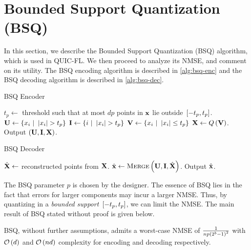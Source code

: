 \documentclass[journal,12pt,twocolumn]{IEEEtran}
\begin{document}
\section{Bounded Support Quantization (BSQ)}
\label{sec:bsq}
In this section, we describe the Bounded Support Quantization (BSQ) algorithm,
which is used in QUIC-FL. We then proceed to analyze its NMSE, and comment on
its utility. The BSQ encoding algorithm is described in \autoref{alg:bsq-enc}
and the BSQ decoding algorithm is described in \autoref{alg:bsq-dec}.
\begin{algorithm}[H]
    \caption{BSQ Encoder}
    \label{alg:bsq-enc}
    \begin{algorithmic}[1]
        \State $t_p \gets$ threshold such that at most \(dp\) points in
        \(\boldsymbol{\mathbf{x}}\) lie outside \({}\left[-t_p, t_p\right]\).
        \State $\boldsymbol{\mathbf{U}} \gets \left\{x_{i}\ |\ \left\vert x_{i}\right\vert > t_p\right\}$
        \State $\vect{I} \gets \cbrak{i\ |\ \abs{x_{i}} > t_p}$
        \State $\boldsymbol{\mathbf{V}} \gets \left\{x_{i}\ |\ \left\vert x_{i}\right\vert \le t_p\right\}$
        \State $\boldsymbol{\mathbf{X}} \gets Q\left(\boldsymbol{\mathbf{V}}\right)$.
        \State Output $\left(\boldsymbol{\mathbf{U}}, \boldsymbol{\mathbf{I}}, \boldsymbol{\mathbf{X}}\right)$.
        \EndProcedure
    \end{algorithmic}
\end{algorithm}

\begin{algorithm}[H]
    \caption{BSQ Decoder}
    \label{alg:bsq-dec}
    \begin{algorithmic}[1]
        \State $\hat{\boldsymbol{\mathbf{X}}} \gets$ reconstructed points from $\boldsymbol{\mathbf{X}}$.
        \State $\hat{\boldsymbol{\mathbf{x}}} \gets
        \textsc{Merge}\left(\boldsymbol{\mathbf{U}},\boldsymbol{\mathbf{I}},\hat{\boldsymbol{\mathbf{X}}}\right)$. 
        \State Output $\hat{\boldsymbol{\mathbf{x}}}$.
        \EndProcedure
    \end{algorithmic}
\end{algorithm}

The BSQ parameter \(p\) is chosen by the designer. The essence of BSQ lies in
the fact that errors for larger components may incur a larger NMSE. Thus, by
quantizing in a \emph{bounded support} \({}\left[-t_p,t_p\right]\), we can limit the
NMSE. The main result of BSQ stated without proof is given below.

\begin{theorem}
    \label{thm:bsq-nmse}
    BSQ, without further assumptions, admits a worst-case NMSE of
    \(\frac{1}{np\left(2^b-1\right)^2}\) with \(\mathcal O\left(d\right)\) and \(\mathcal O\left(nd\right)\)
    complexity for encoding and decoding respectively.
\end{theorem}
\end{document}

